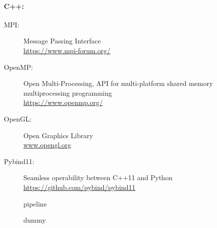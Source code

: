 \paragraph{C++:}
\begin{description}
\item[MPI:] Message Passing Interface \cite{message2015mpi}\\
\url{https://www.mpi-forum.org/}
\item[OpenMP:] Open Multi-Processing, API for multi-platform shared memory multiprocessing programming \cite{dagum1998openmp}\\
\url{https://www.openmp.org/}
\item[OpenGL:] Open Graphics Library \cite{khronos}\\
\url{www.opengl.org}
\item[Pybind11:] Seamless operability between C++11 and Python \cite{pybind11}\\ \url{https://github.com/pybind/pybind11} 
\end{description}
% 
% 
\begin{figure}[!t]
\centering
{}
\caption{pipeline}
\label{fig:sim_pipeline}
\end{figure}
% 
\begin{figure}[!t]
    \centering
	\caption{dummy}
	\label{fig:fastpli_wiki_home}
\end{figure}
